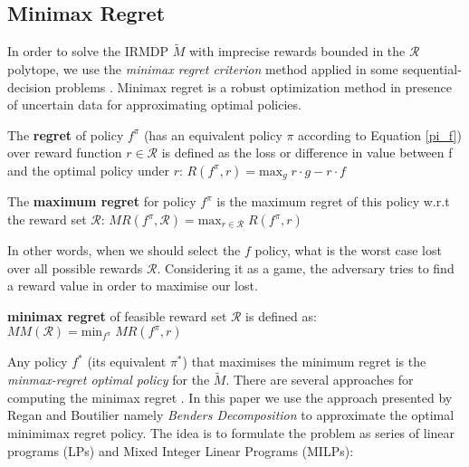 \documentclass[runningheads,a4paper]{llncs}
\begin{document}
\subsection{Minimax Regret}
In order to solve the IRMDP $\tilde{M}$ with imprecise rewards bounded in the $\mathcal{R}$ polytope, we use the \textit{minimax regret criterion} method applied in some sequential-decision problems \cite{Regan2009,Xu2009}. Minimax regret is a robust optimization method in presence of uncertain data for approximating optimal policies. 

\begin{definition}
The \textbf{regret} of policy $f^{\pi}$ (has an equivalent policy $\pi$ according to Equation \ref{pi_f}) over reward function $r \in \mathcal{R}$ is defined as the loss or difference in value between f and the optimal policy under $r$: $R(f^{\pi}, r) = \text{max}_{g} \; r \cdot g - r \cdot f$
\end{definition}

\begin{definition}
The \textbf{maximum regret} for policy $f^{\pi}$ is the maximum regret of this policy w.r.t the reward set $\mathcal{R}$: $MR(f^{\pi}, \mathcal{R}) = \text{max}_{r \in \mathcal{R}}\;R(f^{\pi},r)$ 
\end{definition}

In other words, when we should select the $f$ policy, what is the worst case lost over all possible rewards $\mathcal{R}$. Considering it as a game, the adversary tries to find a reward value in order to maximise our lost.  

\begin{definition}
\textbf{minimax regret} of feasible reward set $\mathcal{R}$ is defined as:\\ $MM(\mathcal{R}) = \text{min}_{f^{\pi}}\; MR(f^{\pi}, r)$
\end{definition}

Any policy $f^*$ (its equivalent $\pi^*$) that maximises the minimum regret is the \textit{minmax-regret optimal policy} for the $\tilde{M}$. There are several approaches for computing the minimax regret \cite{alizadeh2015,benavent2018,Regan2009,daSilva2011,Xu2009}. In this paper we use the approach presented by Regan and Boutilier \citep{Regan2009} namely \textit{Benders Decomposition} \cite{Benders1962} to approximate the optimal minimimax regret policy. The idea is to formulate the problem as series of linear programs (LPs) and Mixed Integer Linear Programs (MILPs):

\end{document}
